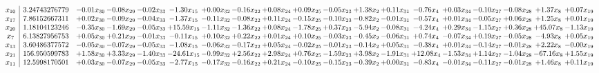 \documentclass[9pt]{article}
\begin{document}
 \[\begin{array}{c| c c@{\hskip 2pt} c@{\hskip 2pt} c@{\hskip 2pt} c@{\hskip 2pt} c@{\hskip 2pt} c@{\hskip 2pt} c@{\hskip 2pt} c@{\hskip 2pt} c@{\hskip 2pt} c@{\hskip 2pt} c@{\hskip 2pt} c@{\hskip 2pt} c@{\hskip 2pt} c@{\hskip 2pt} c@{\hskip 2pt} c@{\hskip 2pt} c@{\hskip 2pt} }
 x_{10}   &  3.24743276779 & -0.01 x_{30} & -0.08 x_{29} & -0.02 x_{33} & -1.30 x_{15} & +  0.00 x_{32} & -0.16 x_{22} & +  0.08 x_{24} & +  0.09 x_{25} & -0.05 x_{23} & +  1.38 x_{2} & +  0.11 x_{31} & -0.76 x_{4} & +  0.03 x_{34} & -0.10 x_{27} & -0.08 x_{28} & +  1.37 x_{8} & +  0.07 x_{19}\\
 x_{17}   &  7.86152667311 & +  0.02 x_{30} & -0.09 x_{29} & -0.04 x_{33} & -1.37 x_{15} & -0.11 x_{32} & -0.08 x_{22} & +  0.11 x_{24} & -0.15 x_{25} & -0.10 x_{23} & -0.82 x_{2} & -0.01 x_{31} & -0.57 x_{4} & +  0.01 x_{34} & -0.05 x_{27} & +  0.06 x_{28} & +  1.25 x_{8} & +  0.01 x_{19}\\
 x_{20}   &  1.18104123246 & -0.35 x_{30} & -1.69 x_{29} & -0.05 x_{33} & + 15.59 x_{15} & -1.11 x_{32} & -1.36 x_{22} & +  0.08 x_{24} & -1.78 x_{25} & +  0.37 x_{23} & -5.94 x_{2} & -0.08 x_{31} & -4.24 x_{4} & +  0.29 x_{34} & -1.15 x_{27} & +  0.36 x_{28} & + 45.07 x_{8} & -1.13 x_{19}\\
 x_{7}   &  6.13827956753 & +  0.05 x_{30} & +  0.21 x_{29} & -0.01 x_{33} & -0.11 x_{15} & +  0.10 x_{32} & +  0.22 x_{22} & +  0.01 x_{24} & +  0.10 x_{25} & -0.03 x_{23} & -0.45 x_{2} & -0.06 x_{31} & +  0.74 x_{4} & -0.07 x_{34} & +  0.19 x_{27} & -0.05 x_{28} & -4.93 x_{8} & +  0.05 x_{19}\\
 x_{13}   &  3.60486377572 & -0.05 x_{30} & -0.07 x_{29} & -0.05 x_{33} & -1.08 x_{15} & -0.06 x_{32} & -0.17 x_{22} & +  0.05 x_{24} & -0.02 x_{25} & -0.01 x_{23} & -0.14 x_{2} & +  0.05 x_{31} & -0.38 x_{4} & +  0.01 x_{34} & -0.14 x_{27} & -0.01 x_{28} & +  2.22 x_{8} & -0.00 x_{19}\\
 x_{21}   &  156.950599783 & +  1.58 x_{30} & +  3.33 x_{29} & -1.40 x_{33} & -24.61 x_{15} & -0.99 x_{32} & +  2.56 x_{22} & +  2.98 x_{24} & +  0.76 x_{25} & -1.59 x_{23} & +  3.98 x_{2} & -1.91 x_{31} & + 12.08 x_{4} & -1.53 x_{34} & +  1.14 x_{27} & -1.04 x_{28} & -67.16 x_{8} & +  1.55 x_{19}\\
 x_{11}   &  12.5998170501 & +  0.03 x_{30} & -0.07 x_{29} & -0.05 x_{33} & -2.77 x_{15} & -0.17 x_{32} & -0.16 x_{22} & +  0.21 x_{24} & -0.10 x_{25} & -0.15 x_{23} & -0.39 x_{2} & +  0.00 x_{31} & -0.83 x_{4} & -0.01 x_{34} & -0.11 x_{27} & -0.01 x_{28} & +  1.46 x_{8} & +  0.11 x_{19}\\

\end{array}\]
\end{document}
